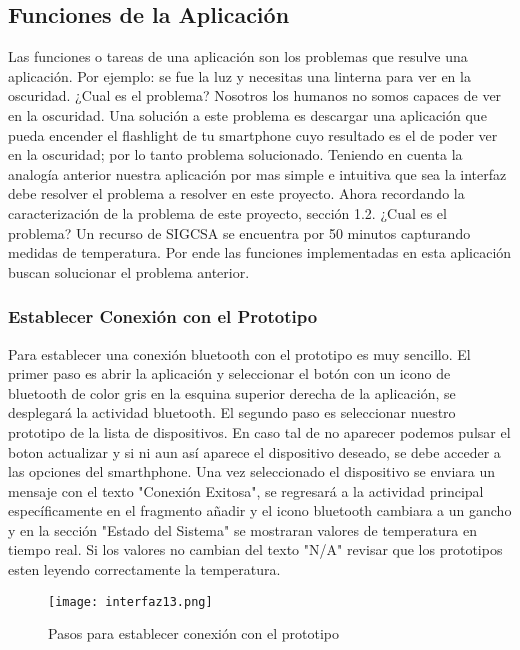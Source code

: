 \subsection{Funciones de la Aplicación}

\par 
Las funciones o tareas de una aplicación son los problemas que resulve una aplicación. Por ejemplo: se fue la luz y necesitas una linterna para ver en la oscuridad. ¿Cual es el problema? Nosotros los humanos no somos capaces de ver en la oscuridad. Una solución a este problema es descargar una aplicación que pueda encender el flashlight de tu smartphone cuyo resultado es el de poder ver en la oscuridad; por lo tanto problema solucionado. Teniendo en cuenta la analogía anterior nuestra aplicación por mas simple e intuitiva que sea la interfaz debe resolver el problema a resolver en este proyecto. Ahora recordando la caracterización de la problema de este proyecto, sección 1.2. ¿Cual es el problema? Un recurso de SIGCSA se encuentra por 50 minutos capturando medidas de temperatura. Por ende las funciones implementadas en esta aplicación buscan solucionar el problema anterior.

\subsubsection{Establecer Conexión con el Prototipo}

\par 
Para establecer una conexión bluetooth con el prototipo es muy sencillo. El primer paso es abrir la aplicación y seleccionar el botón con un icono de bluetooth de color gris en la esquina superior derecha de la aplicación, se desplegará la actividad bluetooth. El segundo paso es seleccionar nuestro prototipo de la lista de dispositivos. En caso tal de no aparecer podemos pulsar el boton actualizar y si ni aun así aparece el dispositivo deseado, se debe acceder a las opciones del smarthphone. Una vez seleccionado el dispositivo se enviara un mensaje con el texto "Conexión Exitosa", se regresará a la actividad principal específicamente en el fragmento añadir y el icono bluetooth cambiara a un gancho y en la sección "Estado del Sistema" se mostraran valores de temperatura en tiempo real. Si los valores no cambian del texto "N/A" revisar que los prototipos esten leyendo correctamente la temperatura.

\begin{figure}[H]
	\centering
	\texttt{[image: interfaz13.png]}
	\caption{Pasos para establecer conexión con el prototipo}
\end{figure}

